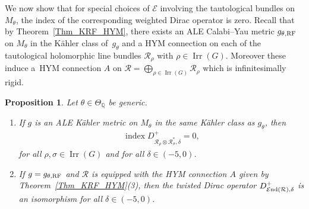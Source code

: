 \documentclass[10pt,a4paper]{amsart}
\numberwithin{equation}{section}
\newcommand{\cE}{\mathcal{E}}
\newcommand{\cR}{\mathcal{R}}
\newcommand{\Q}{{\mathbb Q}}
\newcommand{\Irr}{\operatorname{Irr}}
\newcommand{\cEnd}{\cE{\rm nd}}
\newcommand{\ind}{\mathop{\mathrm{index}}}
\newcommand{\RF}{{\rm RF}}
\newtheorem{Proposition}[Theorem]{Proposition}
 { \theoremstyle{definition}
\newtheorem{Definition}[Theorem]{Definition}
\newtheorem{Remark}[Theorem]{Remark} }
\begin{document}
We now show that for special choices of $\cE$ involving the
tautological bundles on $M_\theta$, the index of the corresponding
weighted Dirac operator is zero.  Recall that by Theorem~\ref{Thm_KRF_HYM},
there exists an ALE Calabi--Yau metric $g_{\theta, \RF}$ on $M_\theta$
in the K\"ahler class of~$g_{\theta}$ and a HYM connection on each of
the tautological holomorphic line bundles $\cR_{\rho}$ with $\rho\in
\Irr(G)$.  Moreover these induce a~HYM connection $A$ on $\cR =
\bigoplus_{\rho\in \Irr(G)} \cR_{\rho}$ which is inf\/initesimally
rigid.

\begin{Proposition}\label{prop:mv}
  Let $\theta\in\Theta_\Q$ be generic.
  \begin{enumerate}\itemsep=0pt
  \item[$(1)$] If $g$ is an ALE K\"ahler metric on $M_\theta$ in the same
    K\"ahler class as $g_\theta$, then
    \begin{gather*}%
      \ind D^{+}_{\cR_\rho\otimes \cR_\sigma^*, \delta}=0,
    \end{gather*}
    for all $\rho, \sigma \in \Irr(G)$ and for all $\delta \in (-5,
    0)$.
  \item[$(2)$] If $g=g_{\theta,\RF}$ and $\cR$ is equipped with the HYM
    connection $A$ given by Theorem~{\rm \ref{Thm_KRF_HYM}(3)}, then
    the twisted Dirac operator $D^{+}_{\cEnd(\cR),\delta}$ is an
    isomorphism for all $\delta \in (-5, 0)$.
  \end{enumerate}
\end{Proposition}
\end{document}
